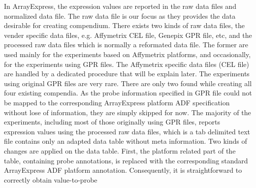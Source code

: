 In ArrayExpress, the expression values are reported in the raw data files
and normalized data file.
%
The raw data file is our focus as they provides the data desirable for
creating compendium.
%
There exists two kinds of raw data files, the vender specific data files,
e.g. Affymetrix CEL file, Genepix GPR file, etc, and the processed raw
data files which is normally a reformated data file.
%
  The former are used mainly for the
experiments based on Affymetrix platforms, and occasionally, for the
experiments using GPR files.
%
The Affymetrix specific data files (CEL file) are handled by a dedicated
procedure that will be explain later.
%
The experiments using original GPR files are very rare.  There are only
two found while creating all four existing compendia.  As the probe
information specified in GPR file could not be mapped to the
corresponding ArrayExpress platform ADF specification without lose of
information, they are simply skipped for now.
%
%
%
The majority of the experiments, including most of those originally using
GPR files, reports expression values using the processed raw data files,
which is a tab delimited text file contains only an adapted data table
without meta information.
%
Two kinds of changes are applied on the data table.  First, the platform
related part of the table, containing probe annotations, is replaced with
the corresponding standard ArrayExpress ADF platform annotation.
%
Consequently, it is straightforward to correctly obtain value-to-probe
